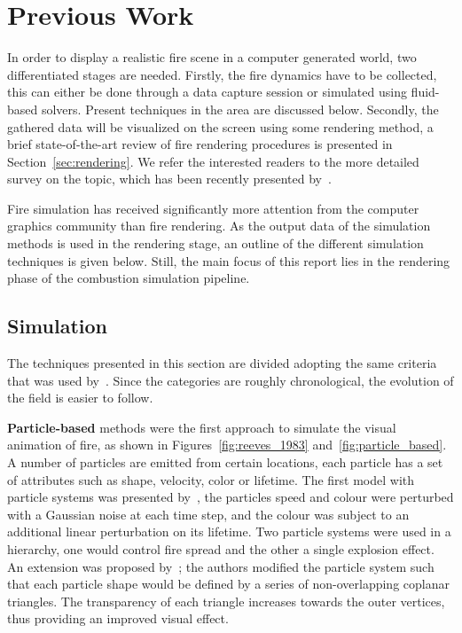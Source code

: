 \chapter{Previous Work}
\label{ch:previous_work}

In order to display a realistic fire scene in a computer generated world, two differentiated stages are needed.
Firstly, the fire dynamics have to be collected, this can either be done through a data capture session or simulated using fluid-based solvers.
Present techniques in the area are discussed below. 
Secondly, the gathered data will be visualized on the screen using some rendering method, a brief state-of-the-art review of fire rendering procedures is presented in Section~\ref{sec:rendering}.
We refer the interested readers to the more detailed survey on the topic, which has been recently presented by~\cite{Huang:2014}.

Fire simulation has received significantly more attention from the computer graphics community than fire rendering.
As the output data of the simulation methods is used in the rendering stage, an outline of the different simulation techniques is given below. 
Still, the main focus of this report lies in the rendering phase of the combustion simulation pipeline.

\section{Simulation}
\label{sec:simulation}


The techniques presented in this section are divided adopting the same criteria that was used by~\cite{Huang:2014}.
Since the categories are roughly chronological, the evolution of the field is easier to follow.

\textbf{Particle-based} methods were the first approach to simulate the visual animation of fire, as shown in Figures~\ref{fig:reeves_1983} and~\ref{fig:particle_based}.
A number of particles are emitted from certain locations, each particle has a set of attributes such as shape, velocity, color or lifetime.
The first model with particle systems was presented by~\cite{Reeves:1983}, the particles speed and colour were perturbed with a Gaussian noise at each time step, and the colour was subject to an additional linear perturbation on its lifetime.
Two particle systems were used in a hierarchy, one would control fire spread and the other a single explosion effect.
An extension was proposed by~\cite{Perry:1994}; the authors modified the particle system such that each particle shape would be defined by a series of non-overlapping coplanar triangles.
The transparency of each triangle increases towards the outer vertices, thus providing an improved visual effect.

